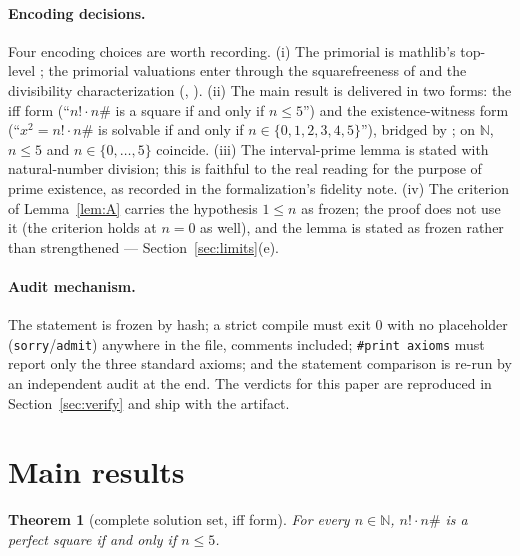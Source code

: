 \documentclass[11pt]{article}
\newtheorem{theorem}{Theorem}
\theoremstyle{definition}
\begin{document}
\paragraph{Encoding decisions.} Four encoding choices are worth recording.
(i) The primorial is mathlib's top-level ; the primorial
valuations enter through the squarefreeness of  and the
divisibility characterization 
(, ).
(ii) The main result is delivered in two forms: the iff form
 (``$n! \cdot n\#$ is a square if
and only if $n \le 5$'') and the existence-witness form
 (``$x^2 = n! \cdot n\#$ is
solvable if and only if $n \in \{0,1,2,3,4,5\}$''), bridged by
; on $\mathbb{N}$, $n \le 5$ and
$n \in \{0,\ldots,5\}$ coincide. (iii) The interval-prime lemma is stated
with natural-number division; this is faithful to the real reading for the
purpose of prime existence, as recorded in the formalization's fidelity
note. (iv) The criterion of Lemma~\ref{lem:A} carries the hypothesis
$1 \le n$ as frozen; the proof does not use it (the criterion holds at
$n = 0$ as well), and the lemma is stated as frozen rather than strengthened
--- Section~\ref{sec:limits}(e).

\paragraph{Audit mechanism.} The statement is frozen by hash; a strict
compile must exit $0$ with no placeholder (\texttt{sorry}/\texttt{admit})
anywhere in the file, comments included; \texttt{\#print axioms} must report
only the three standard axioms; and the statement comparison is re-run by an
independent audit at the end. The verdicts for this paper are reproduced in
Section~\ref{sec:verify} and ship with the artifact.

\section{Main results}\label{sec:results}

\begin{theorem}[complete solution set, iff form]\label{thm:main}
For every $n \in \mathbb{N}$, $n! \cdot n\#$ is a perfect square if and only
if $n \le 5$.
\end{theorem}
\end{document}
